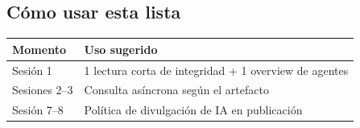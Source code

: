 \subsection*{Cómo usar esta lista}
\begin{tabularx}{\textwidth}{@{}lX@{}}
\toprule
Momento & Uso sugerido \\
\midrule
Sesión 1 & 1 lectura corta de integridad + 1 overview de agentes \\
Sesiones 2--3 & Consulta asíncrona según el artefacto \\
Sesión 7--8 & Política de divulgación de IA en publicación \\
\bottomrule
\end{tabularx}
